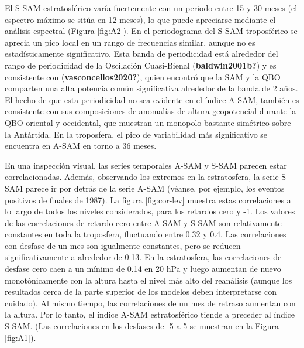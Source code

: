\documentclass[12pt,oneside]{reedthesis}
\begin{document}
El S\nobreakdash-SAM estratosférico varía fuertemente con un periodo entre 15 y 30 meses (el espectro máximo se sitúa en 12 meses), lo que puede apreciarse mediante el análisis espectral (Figura \ref{fig:A2}). En el periodograma del S\nobreakdash-SAM troposférico se aprecia un pico local en un rango de frecuencias similar, aunque no es estadísticamente significativo. Esta banda de periodicidad está alrededor del rango de periodicidad de la Oscilación Cuasi-Bienal (\textbf{baldwin2001b?}) y es consistente con (\textbf{vasconcellos2020?}), quien encontró que la SAM y la QBO comparten una alta potencia común significativa alrededor de la banda de 2 años.
El hecho de que esta periodicidad no sea evidente en el índice A\nobreakdash-SAM, también es consistente con sus composiciones de anomalías de altura geopotencial durante la QBO oriental y occidental, que muestran un monopolo bastante simétrico sobre la Antártida.
En la troposfera, el pico de variabilidad más significativo se encuentra en A\nobreakdash-SAM en torno a 36 meses.

En una inspección visual, las series temporales A\nobreakdash-SAM y S\nobreakdash-SAM parecen estar correlacionadas.
Además, observando los extremos en la estratosfera, la serie S\nobreakdash-SAM parece ir por detrás de la serie A\nobreakdash-SAM (véanse, por ejemplo, los eventos positivos de finales de 1987).
La figura \ref{fig:cor-lev} muestra estas correlaciones a lo largo de todos los niveles considerados, para los retardos cero y -1.
Los valores de las correlaciones de retardo cero entre A\nobreakdash-SAM y S\nobreakdash-SAM son relativamente constantes en toda la troposfera, fluctuando entre 0.32 y 0.4.
Las correlaciones con desfase de un mes son igualmente constantes, pero se reducen significativamente a alrededor de 0.13.
En la estratosfera, las correlaciones de desfase cero caen a un mínimo de 0.14 en 20 hPa y luego aumentan de nuevo monotónicamente con la altura hasta el nivel más alto del reanálisis (aunque los resultados cerca de la parte superior de los modelos deben interpretarse con cuidado).
Al mismo tiempo, las correlaciones de un mes de retraso aumentan con la altura.
Por lo tanto, el índice A\nobreakdash-SAM estratosférico tiende a preceder al índice S\nobreakdash-SAM.
(Las correlaciones en los desfases de -5 a 5 se muestran en la Figura \ref{fig:A1}).
\end{document}
